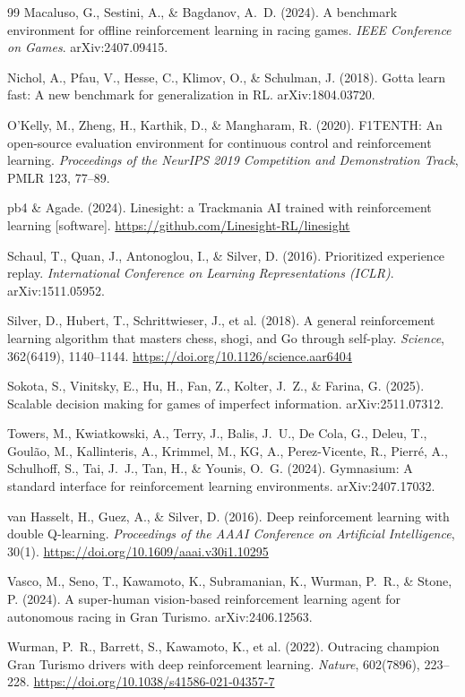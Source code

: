 \documentclass[11pt]{article}
\begin{document}
\begin{thebibliography}{99}
 Macaluso, G., Sestini, A., \& Bagdanov, A.~D. (2024). A benchmark environment for offline reinforcement learning in racing games. \textit{IEEE Conference on Games}. arXiv:2407.09415.

 Nichol, A., Pfau, V., Hesse, C., Klimov, O., \& Schulman, J. (2018). Gotta learn fast: A new benchmark for generalization in RL. arXiv:1804.03720.

 O'Kelly, M., Zheng, H., Karthik, D., \& Mangharam, R. (2020). F1TENTH: An open-source evaluation environment for continuous control and reinforcement learning. \textit{Proceedings of the NeurIPS 2019 Competition and Demonstration Track}, PMLR 123, 77--89.

 pb4 \& Agade. (2024). Linesight: a Trackmania AI trained with reinforcement learning [software]. \url{https://github.com/Linesight-RL/linesight}

 Schaul, T., Quan, J., Antonoglou, I., \& Silver, D. (2016). Prioritized experience replay. \textit{International Conference on Learning Representations (ICLR)}. arXiv:1511.05952.

 Silver, D., Hubert, T., Schrittwieser, J., et al. (2018). A general reinforcement learning algorithm that masters chess, shogi, and Go through self-play. \textit{Science}, 362(6419), 1140--1144. \url{https://doi.org/10.1126/science.aar6404}

 Sokota, S., Vinitsky, E., Hu, H., Fan, Z., Kolter, J.~Z., \& Farina, G. (2025). Scalable decision making for games of imperfect information. arXiv:2511.07312.

 Towers, M., Kwiatkowski, A., Terry, J., Balis, J.~U., De Cola, G., Deleu, T., Goul\~ao, M., Kallinteris, A., Krimmel, M., KG, A., Perez-Vicente, R., Pierr\'e, A., Schulhoff, S., Tai, J.~J., Tan, H., \& Younis, O.~G. (2024). Gymnasium: A standard interface for reinforcement learning environments. arXiv:2407.17032.

 van Hasselt, H., Guez, A., \& Silver, D. (2016). Deep reinforcement learning with double Q-learning. \textit{Proceedings of the AAAI Conference on Artificial Intelligence}, 30(1). \url{https://doi.org/10.1609/aaai.v30i1.10295}

 Vasco, M., Seno, T., Kawamoto, K., Subramanian, K., Wurman, P.~R., \& Stone, P. (2024). A super-human vision-based reinforcement learning agent for autonomous racing in Gran Turismo. arXiv:2406.12563.

 Wurman, P.~R., Barrett, S., Kawamoto, K., et al. (2022). Outracing champion Gran Turismo drivers with deep reinforcement learning. \textit{Nature}, 602(7896), 223--228. \url{https://doi.org/10.1038/s41586-021-04357-7}

\end{thebibliography}
\end{document}
